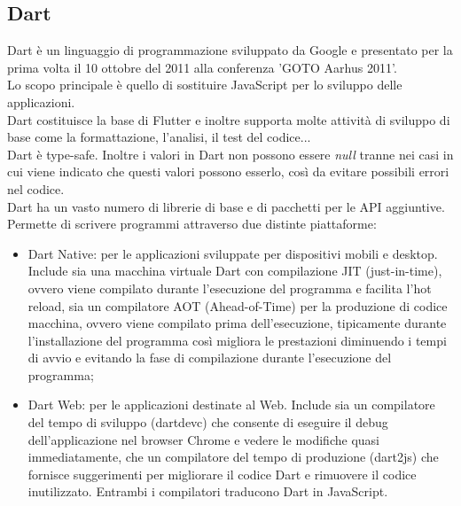 \subsection{Dart}
\label{sec:Dart}
Dart \cite{dart,dartstoria} è un linguaggio di programmazione sviluppato da Google e presentato per la prima volta il 10 ottobre del 2011 alla conferenza 'GOTO Aarhus 2011'.\\
Lo scopo principale è quello di sostituire JavaScript per lo sviluppo delle applicazioni.\\
Dart costituisce la base di Flutter e inoltre supporta molte attività di sviluppo di base come la formattazione, l'analisi, il test del codice...\\
Dart \cite{dartover} è type-safe. Inoltre i valori in Dart non possono essere \textit{null} tranne nei casi in cui viene indicato che questi valori possono esserlo, così da evitare possibili errori nel codice.\\
Dart ha un vasto numero di librerie di base e di pacchetti per le API aggiuntive.\\
Permette di scrivere programmi attraverso due distinte piattaforme: 
\begin{itemize}
	\item Dart Native: per le applicazioni sviluppate per dispositivi mobili e desktop. Include sia una macchina virtuale Dart con compilazione JIT (just-in-time), ovvero viene compilato durante l'esecuzione del programma e facilita l'hot reload, sia un compilatore AOT (Ahead-of-Time) per la produzione di codice macchina, ovvero  viene compilato prima dell'esecuzione, tipicamente durante l'installazione del programma così migliora le prestazioni diminuendo i tempi di avvio e evitando la fase di compilazione durante l'esecuzione del programma;  
	\item Dart Web: per le applicazioni destinate al Web. Include sia un compilatore del tempo di sviluppo (dartdevc) che consente di eseguire il debug dell'applicazione nel browser Chrome e vedere le modifiche quasi immediatamente, che un compilatore del tempo di produzione (dart2js) che fornisce suggerimenti per migliorare il codice Dart e rimuovere il codice inutilizzato. Entrambi i compilatori traducono Dart in JavaScript.\\
\end{itemize}

